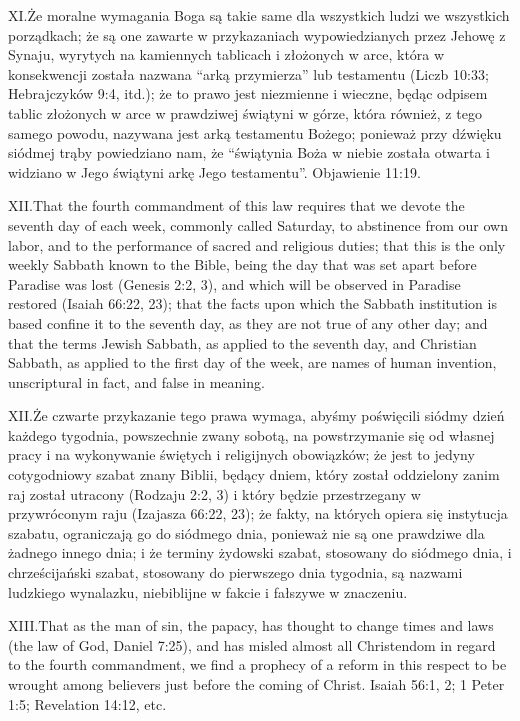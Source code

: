 \lettrine{XI.} Że moralne wymagania Boga są takie same dla wszystkich ludzi we wszystkich porządkach; że są one zawarte w przykazaniach wypowiedzianych przez Jehowę z Synaju, wyrytych na kamiennych tablicach i złożonych w arce, która w konsekwencji została nazwana “arką przymierza” lub testamentu (Liczb 10:33; Hebrajczyków 9:4, itd.); że to prawo jest niezmienne i wieczne, będąc odpisem tablic złożonych w arce w prawdziwej świątyni w górze, która również, z tego samego powodu, nazywana jest arką testamentu Bożego; ponieważ przy dźwięku siódmej trąby powiedziano nam, że “świątynia Boża w niebie została otwarta i widziano w Jego świątyni arkę Jego testamentu”. Objawienie 11:19.


\lettrine{XII.} That the fourth commandment of this law requires that we devote the seventh day of each week, commonly called Saturday, to abstinence from our own labor, and to the performance of sacred and religious duties; that this is the only weekly Sabbath known to the Bible, being the day that was set apart before Paradise was lost (Genesis 2:2, 3), and which will be observed in Paradise restored (Isaiah 66:22, 23); that the facts upon which the Sabbath institution is based confine it to the seventh day, as they are not true of any other day; and that the terms Jewish Sabbath, as applied to the seventh day, and Christian Sabbath, as applied to the first day of the week, are names of human invention, unscriptural in fact, and false in meaning.


\lettrine{XII.} Że czwarte przykazanie tego prawa wymaga, abyśmy poświęcili siódmy dzień każdego tygodnia, powszechnie zwany sobotą, na powstrzymanie się od własnej pracy i na wykonywanie świętych i religijnych obowiązków; że jest to jedyny cotygodniowy szabat znany Biblii, będący dniem, który został oddzielony zanim raj został utracony (Rodzaju 2:2, 3) i który będzie przestrzegany w przywróconym raju (Izajasza 66:22, 23); że fakty, na których opiera się instytucja szabatu, ograniczają go do siódmego dnia, ponieważ nie są one prawdziwe dla żadnego innego dnia; i że terminy żydowski szabat, stosowany do siódmego dnia, i chrześcijański szabat, stosowany do pierwszego dnia tygodnia, są nazwami ludzkiego wynalazku, niebiblijne w fakcie i fałszywe w znaczeniu.


\lettrine{XIII.} That as the man of sin, the papacy, has thought to change times and laws (the law of God, Daniel 7:25), and has misled almost all Christendom in regard to the fourth commandment, we find a prophecy of a reform in this respect to be wrought among believers just before the coming of Christ. Isaiah 56:1, 2; 1 Peter 1:5; Revelation 14:12, etc.


